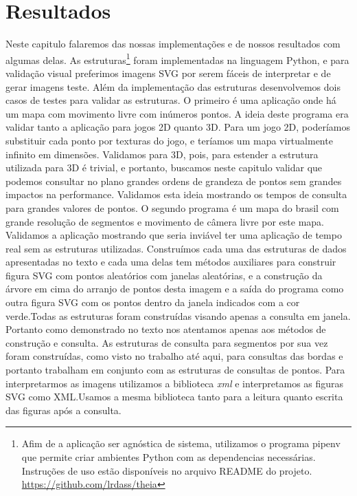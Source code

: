 \chapter{Resultados}
Neste capitulo falaremos das nossas implementações e de nossos resultados com algumas delas. As estruturas\footnote{Afim de a aplicação ser agnóstica de sistema, utilizamos o programa pipenv que permite criar ambientes Python com as dependencias necessárias. Instruções de uso estão disponíveis no arquivo README do projeto. \url{https://github.com/lrdass/theia}} foram implementadas na linguagem Python, e para validação visual preferimos imagens SVG por serem fáceis de interpretar e de gerar imagens teste. Além da implementação das estruturas desenvolvemos dois casos de testes para validar as estruturas. O primeiro é uma aplicação onde há um mapa com movimento livre com inúmeros pontos. A ideia deste programa era validar tanto a aplicação para jogos 2D quanto 3D. Para um jogo 2D, poderíamos substituir cada ponto por texturas do jogo, e teríamos um mapa virtualmente infinito em dimensões. Validamos para 3D, pois, para estender a estrutura utilizada para 3D é trivial, e portanto, buscamos neste capitulo validar que podemos consultar no plano grandes ordens de grandeza de pontos sem grandes impactos na performance. Validamos esta ideia mostrando os tempos de consulta para grandes valores de pontos. O segundo programa é um mapa do brasil com grande resolução de segmentos e movimento de câmera livre por este mapa. Validamos a aplicação mostrando que seria inviável ter uma aplicação de tempo real sem as estruturas utilizadas. Construímos cada uma das estruturas de dados apresentadas no texto e cada uma delas tem métodos auxiliares para construir figura SVG com pontos aleatórios com janelas aleatórias, e a construção da árvore em cima do arranjo de pontos desta imagem e a saída do programa como outra figura SVG com os pontos dentro da janela indicados com a cor verde.Todas as estruturas foram construídas visando apenas a consulta em janela. Portanto como demonstrado no texto nos atentamos apenas aos métodos de construção e consulta. As estruturas de consulta para segmentos por sua vez foram construídas, como visto no trabalho até aqui, para consultas das bordas e portanto trabalham em conjunto com as estruturas de consultas de pontos. Para interpretarmos as imagens utilizamos a biblioteca \textit{xml} e interpretamos as figuras SVG como XML.Usamos a mesma biblioteca tanto para a leitura quanto escrita das figuras após a consulta. 

